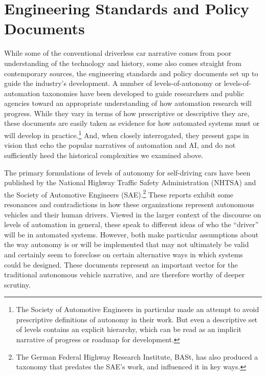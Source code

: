 \section{Engineering Standards and Policy Documents}



While some of the conventional driverless car narrative comes from
poor understanding of the technology and history, some also comes
straight from contemporary sources, the engineering standards and
policy documents set up to
guide the industry's development. A number of levels-of-autonomy or
levels-of-automation taxonomies have been developed to guide
researchers and public agencies toward an appropriate understanding of
how automation research will progress. While they vary in terms of how
prescriptive or descriptive they are, these documents are easily taken
as evidence for how automated systems must or will develop in
practice.\footnote{The Society of Automotive Engineers in particular
  made an attempt to avoid prescriptive definitions of autonomy in
  their work. But even a descriptive set of levels contains an
  explicit hierarchy, which can be read as an implicit narrative of
  progress or roadmap for development.} And, when closely
interrogated, they present gaps in vision that echo the popular
narratives of automation and AI, and do not sufficiently heed the
historical complexities we examined above.

The primary formulations of levels of autonomy for self-driving cars
have been published by the National Highway Traffic Safety
Administration (NHTSA) and the Society of Automotive Engineers
(SAE).\footnote{The German Federal Highway Research Institute, BASt,
 has also produced a taxonomy that predates the SAE's work, and
 influenced it in key ways.}
These reports exhibit some resonances and contradictions in how these
organizations represent autonomous vehicles and their human drivers.
Viewed in the larger context of the discourse on levels of automation
in general, these speak to different ideas of who the ``driver'' will be
in automated systems. However, both make particular assumptions about
the way autonomy is or will be implemented that may not ultimately be
valid and certainly seem to foreclose on certain alternative ways in
which systems could be designed. These documents represent an important
vector for the traditional autonomous vehicle narrative, and are
therefore worthy of deeper scrutiny.

